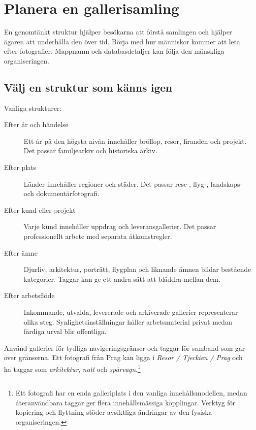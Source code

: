 \documentclass[11pt,a4paper]{article}
\begin{document}
\section{Planera en gallerisamling}
\label{sec:planning}

En genomtänkt struktur hjälper besökarna att förstå samlingen och hjälper ägaren
att underhålla den över tid. Börja med hur människor kommer att leta efter
fotografier. Mappnamn och databasdetaljer kan följa den mänskliga
organiseringen.

\subsection{Välj en struktur som känns igen}

Vanliga strukturer:

\begin{description}
  \item[Efter år och händelse] Ett år på den högsta nivån innehåller bröllop,
  resor, firanden och projekt. Det passar familjearkiv och historiska arkiv.
  \item[Efter plats] Länder innehåller regioner och städer. Det passar rese-,
  flyg-, landskaps- och dokumentärfotografi.
  \item[Efter kund eller projekt] Varje kund innehåller uppdrag och
  leveransgallerier. Det passar professionellt arbete med separata
  åtkomstregler.
  \item[Efter ämne] Djurliv, arkitektur, porträtt, flygplan och liknande ämnen
  bildar bestående kategorier. Taggar kan ge ett andra sätt att bläddra mellan
  dem.
  \item[Efter arbetsflöde] Inkommande, utvalda, levererade och arkiverade
  gallerier representerar olika steg. Synlighetsinställningar håller
  arbetsmaterial privat medan färdiga urval blir offentliga.
\end{description}

Använd gallerier för tydliga navigeringsgränser och taggar för samband som går
över gränserna. Ett fotografi från Prag kan ligga i \emph{Resor / Tjeckien /
Prag} och ha taggar som \emph{arkitektur}, \emph{natt} och
\emph{spårvagn}.\footnote{Ett fotografi har en enda galleriplats i den vanliga
innehållsmodellen, medan återanvändbara taggar ger flera innehållsmässiga
kopplingar. Verktyg för kopiering och flyttning stöder avsiktliga ändringar av
den fysiska organiseringen.}
\end{document}
